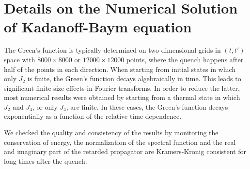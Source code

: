 \documentclass[prx,aps,onecolumn,amsfonts,showpacs,superscriptaddress,preprint,eqsecnum]
{revtex4-1}
\begin{document}
\section{Details on the Numerical Solution of Kadanoff-Baym equation \label{App:IC2}}
The Green's function is typically determined on two-dimensional grids in $(t,t')$ space with $8000 \times 8000$ or $12000 \times 12000$ points, where the quench happens after half of the points in each direction. When starting from initial states in which only $J_2$ is finite, the Green's function decays algebraically in time. This leads to significant finite size effects in Fourier transforms. In order to reduce the latter, most numerical results were obtained by starting from a thermal state in which $J_2$ and $J_4$, or only $J_4$, are finite. In these cases, the Green's function decays exponentially as a function of the relative time dependence.

We checked the quality and consistency of the results by monitoring  the conservation of
energy, the normalization of the spectral function and the real and imaginary part of the retarded propagator are 
Kramers-Kronig consistent for long times after the quench. 
\end{document}

